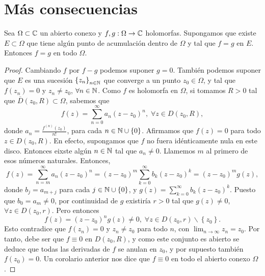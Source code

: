 \section{Más consecuencias}
\begin{theorem}
Sea $\displaystyle \Omega \subset \mathbb{C} $ un abierto conexo y $\displaystyle f,g : \Omega \to \mathbb{C} $ holomorfas. Supongamos que existe $\displaystyle E \subset \Omega  $ que tiene algún punto de acumulación dentro de $\displaystyle \Omega  $ y tal que $\displaystyle f = g $ en $\displaystyle E $. Entonces $\displaystyle f = g $ en todo $\displaystyle \Omega  $.
\end{theorem}
\begin{proof}
	Cambiando $\displaystyle f $ por $\displaystyle f-g $ podemos suponer $\displaystyle g = 0 $. También podemos suponer que $\displaystyle E $ es una sucesión $\displaystyle \left\{ z_{n}\right\} _{n\in\mathbb{N} } $ que converge a un punto $\displaystyle z_{0}\in \Omega  $, y tal que $\displaystyle f\left(z_{n}\right)=0 $ y $\displaystyle z_{n} \neq z_{0} $, $\displaystyle \forall n \in \mathbb{N} $. 
	Como $\displaystyle f $ es holomorfa en $\displaystyle \Omega  $, si tomamos $\displaystyle R > 0 $ tal que $\displaystyle \overline{D}\left(z_{0}, R\right)\subset \Omega  $, sabemos que 
	\[f\left(z\right)=\sum^{\infty}_{n = 0}a_{n}\left(z-z_{0}\right)^{n}, \; \forall z \in D\left(z_{0}, R\right) ,\]
	donde $\displaystyle a_{n}=\frac{f^{\left(n\right)}\left(z_{0}\right)}{n!} $, para cada $\displaystyle n \in \mathbb{N} \cup \left\{ 0\right\}  $. Afirmamos que $\displaystyle f\left(z\right)=0 $ para todo $\displaystyle z\in D\left(z_{0}, R\right) $. En efecto, supongamos que $\displaystyle f $ no fuera idénticamente nula en este disco. 
	Entonces eixste algún $\displaystyle n \in \mathbb{N} $ tal que $\displaystyle a_{n} \neq 0 $. Llamemos $\displaystyle m $ al primero de esos números naturales. Entonces,
	\[f\left(z\right)=\sum^{\infty}_{n = m}a_{n}\left(z-z_{0}\right)^{n}=\left(z-z_{0}\right)^{m}\sum^{\infty}_{k = 0}b_{k}\left(z-z_{0}\right)^{k}=\left(z-z_{0}\right)^{m}g\left(z\right) ,\]
	donde $\displaystyle b_{j}=a_{m + j} $ para cada $\displaystyle j \in \mathbb{N} \cup \left\{ 0\right\}  $, y $\displaystyle g\left(z\right)=\sum^{\infty}_{ k = 0}b_{k}\left(z-z_{0}\right)^{k} $. 
	Puesto que $\displaystyle b_{0}=a_{m}\neq 0 $, por continuidad de $\displaystyle g $ existiría $\displaystyle r > 0 $ tal que $\displaystyle g\left(z\right)\neq 0 $, $\displaystyle \forall z \in D\left(z_{0}, r\right) $. Pero entonces
	\[f\left(z\right)=\left(z-z_{0}\right)^{n}g\left(z\right)\neq 0, \; \forall z \in D\left(z_{0}, r\right) \backslash \left\{ z_{0}\right\}  .\]
	Esto contradice que $\displaystyle f\left(z_{n}\right)=0 $ y $\displaystyle z_{n} \neq z_{0} $ para todo $\displaystyle n $, con $\displaystyle \lim_{n \to \infty}z_{n}=z_{0} $. Por tanto, debe ser que $\displaystyle f \equiv 0 $ en $\displaystyle D\left(z_{0}, R\right) $, y como este conjunto es abierto se deduce que todas las derivadas de $\displaystyle f $ se anulan en $\displaystyle z_{0} $, y por supuesto también $\displaystyle f\left(z_{0}\right)=0 $. Un corolario anterior nos dice que $\displaystyle f \equiv 0 $ en todo el abierto conexo $\displaystyle \Omega  $.
\end{proof}
